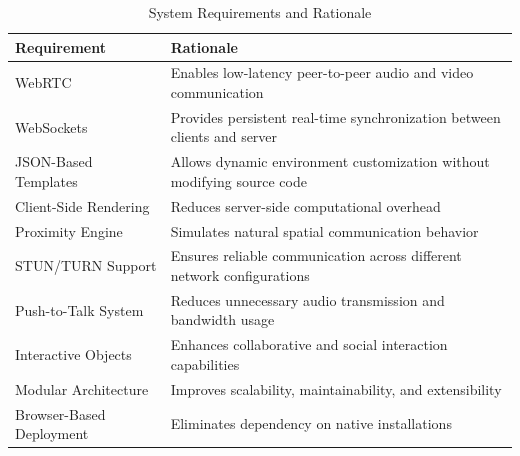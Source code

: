 \documentclass[12pt]{article}
\begin{document}
\begin{table}[h!]
\centering
\renewcommand{\arraystretch}{1.5}
\begin{tabular}{|p{6cm}|p{8cm}|}
\hline
\textbf{Requirement} & \textbf{Rationale} \\ 
\hline

WebRTC & Enables low-latency peer-to-peer audio and video communication \\ 
\hline

WebSockets & Provides persistent real-time synchronization between clients and server \\ 
\hline

JSON-Based Templates & Allows dynamic environment customization without modifying source code \\ 
\hline

Client-Side Rendering & Reduces server-side computational overhead \\ 
\hline

Proximity Engine & Simulates natural spatial communication behavior \\ 
\hline

STUN/TURN Support & Ensures reliable communication across different network configurations \\ 
\hline

Push-to-Talk System & Reduces unnecessary audio transmission and bandwidth usage \\ 
\hline

Interactive Objects & Enhances collaborative and social interaction capabilities \\ 
\hline

Modular Architecture & Improves scalability, maintainability, and extensibility \\ 
\hline

Browser-Based Deployment & Eliminates dependency on native installations \\ 
\hline

\end{tabular}
\caption{System Requirements and Rationale}
\end{table}
\end{document}
